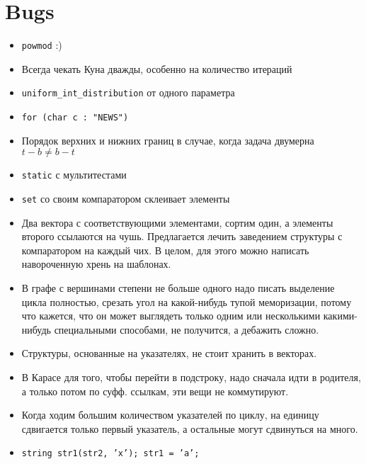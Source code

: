 \section{Bugs}

\begin{itemize}
	\item \texttt{powmod} :)

	\item Всегда чекать Куна дважды, особенно на количество итераций

	\item \texttt{uniform_int_distribution} от одного параметра

	\item \texttt{for (char c : "NEWS")}

	\item Порядок верхних и нижних границ в случае, когда задача двумерна
		$t - b \neq b - t$

	\item \texttt{static} с мультитестами

	\item \texttt{set} со своим компаратором склеивает элементы

	\item Два вектора с соответствующими элементами, сортим один, а элементы
		второго ссылаются на чушь. Предлагается лечить заведением структуры с
		компаратором на каждый чих. В целом, для этого можно написать навороченную
		хрень на шаблонах.

	\item В графе с вершинами степени не больше одного надо писать выделение
		цикла полностью, срезать угол на какой-нибудь тупой меморизации, потому
		что кажется, что он может выглядеть только одним или несколькими
		какими-нибудь специальными способами, не получится, а дебажить сложно.

	\item Структуры, основанные на указателях, не стоит хранить в векторах.

	\item В Карасе для того, чтобы перейти в подстроку, надо сначала идти в
		родителя, а только потом по суфф. ссылкам, эти вещи не коммутируют.

	\item Когда ходим большим количеством указателей по циклу, на единицу
		сдвигается только первый указатель, а остальные могут сдвинуться на много.

	\item \texttt{string str1(str2, 'x'); str1 = 'a';}
\end{itemize}
